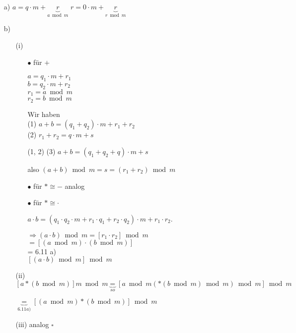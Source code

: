 \documentclass[a4paper, 12pt, twoside] {article}
\begin{document}
\begin{itemize}

\item[a)] $a = q  \cdot  m + \underbrace{r}_{a \bmod m}$
$ r = 0  \cdot  m + \underbrace{r}_{r \bmod m}$

\item[b)]

\begin{itemize}

\item[(i)]

\begin{itemize}
\item[$\bullet$] für $+$

$a = q_1  \cdot  m + r_1$ \\
$b = q_2  \cdot  m + r_2$ \\
$r_1 = a \bmod m$ \\
$r_2 = b \bmod m$

Wir haben \\
(1) $a + b = (q_1 + q_2) \cdot m + r_1 + r_2$ \\
(2) $r_1 + r_2 = q \cdot m + s$

(1, 2) (3) $a + b = (q_1 + q_2 + q) \cdot m + s$

also $(a + b) \bmod m = s = (r_1 + r_2) \bmod m$

\item[$\bullet$] für $* \cong -$ analog
\item[$\bullet$] für $* \cong \cdot$

$a \cdot b = (q_1  \cdot  q_2  \cdot  m + r_1  \cdot  q_1 + r_2  \cdot  q_2)  \cdot  m + r_1  \cdot  r_2.$

$\Rightarrow (a \cdot b) \bmod m = [r_1  \cdot  r_2] \bmod m$ \\
$= [(a \bmod m)  \cdot  (b \bmod m)] $\\
 = 6.11 a) \\
$ [(a  \cdot  b) \bmod m] \bmod m$

\end{itemize}

\item [(ii)] $[a * (b \bmod m)] m \bmod m \underbrace{=}_{so} [a \bmod m( * (b \bmod m) \bmod m) \bmod m] \bmod m$

 $\underbrace{=}_{6.11a)} [(a \bmod m) * (b \bmod m)] \bmod m$ \\

\item[(iii)] analog \hfill $\square$

\end{itemize}
\end{itemize}
\end{document}
